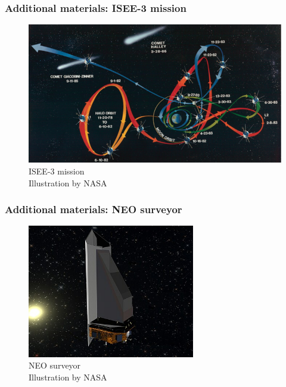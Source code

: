 \documentclass[xcolor={dvipsnames}]{beamer}
\begin{document}
\begin{frame}
\frametitle{Additional materials: ISEE-3 mission}

\begin{figure}[h]
    \centering
    \includegraphics[width=\textwidth]{fig/static/isee-mission.png}
        \caption{ISEE-3 mission\\\tiny{Illustration by NASA}}
    \label{fig:isee-mission}
\end{figure}

\end{frame}

\begin{frame}
\frametitle{Additional materials: NEO surveyor}

\begin{figure}[h]
    \centering
    \includegraphics[width=0.65\textwidth]{fig/static/neo-surveyor.jpg}
        \caption{NEO surveyor\\\tiny{Illustration by NASA}}
    \label{fig:isee-mission}
\end{figure}

\end{frame}
\end{document}
